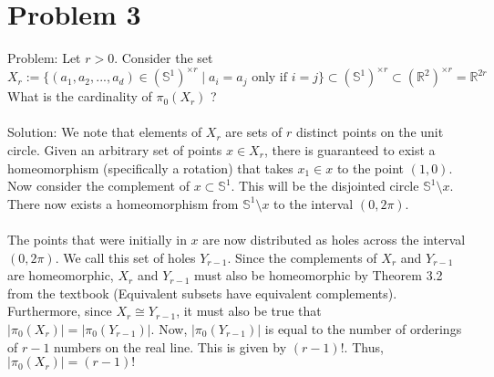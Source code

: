 \documentclass{article}
\begin{document}
\section*{Problem 3}
Problem: Let $r > 0$. Consider the set
$$X_r := \{ (a_1, a_2, ... , a_d) \in (\mathbb{S}^1)^{\times r} \mid a_i = a_j \text{ only if } i = j \} \subset (\mathbb{S}^1)^{\times r} \subset (\mathbb{R}^2)^{\times r} = \mathbb{R}^{2r}$$
What is the cardinality of 
$ \pi _0 (X_r)$
? \\\\
Solution: We note that elements of
$X_r$
are sets of
$r$
distinct points on the unit circle. Given an arbitrary set of points
$x \in X_r$,
there is guaranteed to exist a homeomorphism (specifically a rotation) that takes
$x_1 \in x$
to the point 
$(1,0)$.
Now consider the complement of
$x \subset \mathbb{S}^1$.
This will be the disjointed circle
$\mathbb{S}^1 \setminus x$.
There now exists a homeomorphism from
$\mathbb{S}^1 \setminus x$
to the interval
$(0, 2 \pi)$. \\\\
The points that were initially in
$x$
are now distributed as holes across the interval
$(0, 2 \pi)$.
We call this set of holes
$Y_{r-1}$.
Since the complements of
$X_r$
and 
$Y_{r-1}$
are homeomorphic,
$X_r$
and
$Y_{r-1}$
must also be homeomorphic by Theorem 3.2 from the textbook (Equivalent subsets have equivalent complements). Furthermore, since
$X_r \cong Y_{r-1}$,
it must also be true that
$| \pi_0 (X_r) | = | \pi_0 (Y_{r-1}) |$.
Now,
$|  \pi_0 (Y_{r-1}) |$
is equal to the number of orderings of 
$r-1$ numbers on the real line. This is given by
$(r - 1)!$.
Thus,
$| \pi_0 (X_r) | = (r - 1)!$

\newpage
\end{document}
